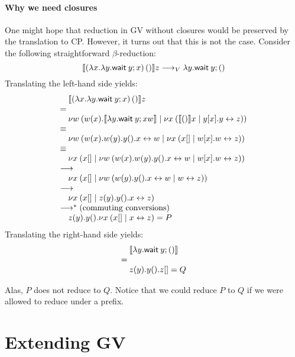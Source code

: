 \documentclass[orivec,envcountsame]{llncs}
\begin{document}
\paragraph{Why we need closures}

One might hope that reduction in GV without closures would be preserved by the translation to
CP. However, it turns out that this is not the case. Consider the following straightforward
$\beta$-reduction:
\[
  \llbracket (\lambda x.\lambda y.\mathsf{wait}\:y; x) \, () \rrbracket z \longrightarrow_V \lambda y.\mathsf{wait}\:y; ()
\]
Translating the left-hand side yields:
\[
\bl
\quad \tocp{(\lambda x.\lambda y.\gvwait{y}; x) \app ()}z \\
= \\
\quad \cut{w}{}{w(x).\tocp{\lambda y.\gvwait{y; x}w}}{\cut{x}{}{\tocp{()}x}{y[x].\link{y}{z}}} \\
\equiv \\
\quad \cut{w}{}{w(x).w(y).y().\link{x}{w}}{\cut{x}{}{x[]}{w[x].\link{w}{z}}} \\
\equiv \\
\quad \cut{x}{}{x[]}{\cut{w}{}{w(x).w(y).y().\link{x}{w}}{w[x].\link{w}{z}}} \\
\rto \\
\quad \cut{x}{}{x[]}{\cut{w}{}{w(y).y().\link{x}{w}}{\link{w}{z}}} \\
\rto \\
\quad \cut{x}{}{x[]}{z(y).y().\link{x}{z}} \\
\rto^* (\text{commuting conversions}) \\
\quad z(y).y().\cut{x}{}{x[]}{\link{x}{z}} = P \\
\el
\]
Translating the right-hand side yields:
\[
\bl
\quad \tocp{\lambda y.\gvwait{y}; ()} \\
= \\
\quad z(y).y().z[] = Q
\el
\]

Alas, $P$ does not reduce to $Q$.
%
Notice that we could reduce $P$ to $Q$ if we were allowed to reduce under a prefix.


\section{Extending GV}\label{sec:extend}
\end{document}
